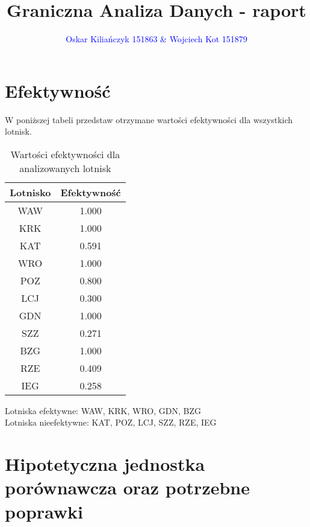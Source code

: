 \documentclass[a4paper,12pt]{article}
\author{\textcolor{blue}{Oskar Kiliańczyk 151863 \& Wojciech Kot 151879}}
\date{}
\title{Graniczna Analiza Danych - raport}
\begin{document}
\maketitle

\section{Efektywność}
W poniższej tabeli przedstaw otrzymane wartości efektywności dla wszystkich lotnisk.
\begin{table}[H]
    \centering
    \begin{tabular}{c|c}
    \hline
         Lotnisko & Efektywność  \\ \hline
         WAW & 1.000 \\
        KRK & 1.000 \\
        KAT & 0.591 \\
        WRO & 1.000 \\
        POZ & 0.800 \\
        LCJ & 0.300 \\
        GDN & 1.000 \\
        SZZ & 0.271 \\
        BZG & 1.000 \\
        RZE & 0.409 \\
        IEG & 0.258 \\
         \hline
    \end{tabular}
    \caption{Wartości efektywności dla analizowanych lotnisk}
    \label{tab:airports-efficiency}
\end{table}

Lotniska efektywne: WAW, KRK, WRO, GDN, BZG \\
Lotniska nieefektywne: KAT, POZ, LCJ, SZZ, RZE, IEG

\section{Hipotetyczna jednostka porównawcza oraz potrzebne poprawki}
\end{document}
